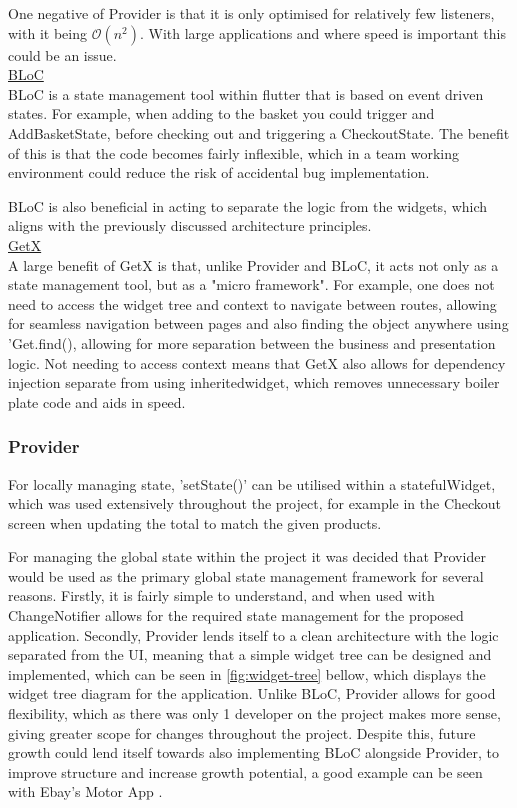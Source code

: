 \documentclass[12pt]{article}
\begin{document}
	One negative of Provider is that it is only optimised for relatively few listeners, with it being $\mathcal{O}(n^2)$. With large applications and where speed is important this could be an issue.
	\\
	
	\noindent \underline{BLoC}
	\\
	BLoC is a state management tool within flutter that is based on event driven states. For example, when adding to the basket you could trigger and AddBasketState, before checking out and triggering a CheckoutState. The benefit of this is that the code becomes fairly inflexible, which in a team working environment could reduce the risk of accidental bug implementation.
	
	BLoC is also beneficial in acting to separate the logic from the widgets, which aligns with the previously discussed architecture principles.
	\\
	

	\noindent \underline{GetX}
	\\
	\noindent
	A large benefit of GetX is that, unlike Provider and BLoC, it acts not only as a state management tool, but as a "micro framework". For example, one does not need to access the widget tree and context to navigate between routes, allowing for seamless navigation between pages and also finding the object anywhere using 'Get.find(), allowing for more separation between the business and presentation logic. Not needing to access context means that GetX also allows for dependency injection separate from using inheritedwidget, which removes unnecessary boiler plate code and aids in speed.

	
	\subsubsection{Provider}
	For locally managing state, 'setState()' can be utilised within a statefulWidget, which was used extensively throughout the project, for example in the Checkout screen when updating the total to match the given products.
	
	For managing the global state within the project it was decided that Provider would be used as the primary global state management framework for several reasons. Firstly, it is fairly simple to understand, and when used with ChangeNotifier allows for the required state management for the proposed application. Secondly, Provider lends itself to a clean architecture with the logic separated from the UI, meaning that a simple widget tree can be designed and implemented, which can be seen in \autoref{fig:widget-tree} bellow, which displays the widget tree diagram for the application. Unlike BLoC, Provider allows for good flexibility, which as there was only 1 developer on the project makes more sense, giving greater scope for changes throughout the project. Despite this, future growth could lend itself towards also implementing BLoC alongside Provider, to improve structure and increase growth potential, a good example can be seen with Ebay's Motor App \cite{techblogEBayMotorsState2021}.
	
\end{document}
